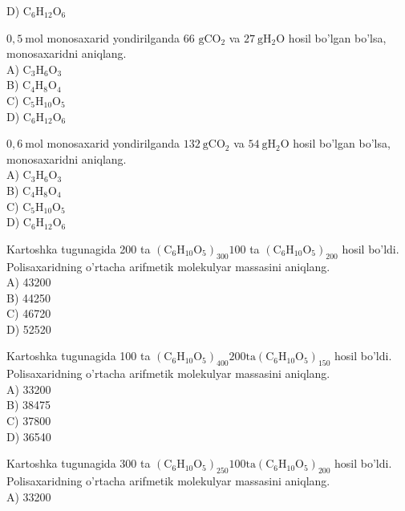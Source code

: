 D) $\mathrm{C}_{6} \mathrm{H}_{12} \mathrm{O}_{6}$
  \item $0,5 \mathrm{~mol}$ monosaxarid yondirilganda 66 $\mathrm{g} \mathrm{CO}_{2}$ va $27 \mathrm{~g} \mathrm{H}_{2} \mathrm{O}$ hosil bo'lgan bo'lsa, monosaxaridni aniqlang.\\
A) $\mathrm{C}_{3} \mathrm{H}_{6} \mathrm{O}_{3}$\\
B) $\mathrm{C}_{4} \mathrm{H}_{8} \mathrm{O}_{4}$\\
C) $\mathrm{C}_{5} \mathrm{H}_{10} \mathrm{O}_{5}$\\
D) $\mathrm{C}_{6} \mathrm{H}_{12} \mathrm{O}_{6}$
  \item $0,6 \mathrm{~mol}$ monosaxarid yondirilganda $132 \mathrm{~g} \mathrm{CO}_{2}$ va $54 \mathrm{~g} \mathrm{H}_{2} \mathrm{O}$ hosil bo'lgan bo'lsa, monosaxaridni aniqlang.\\
A) $\mathrm{C}_{3} \mathrm{H}_{6} \mathrm{O}_{3}$\\
B) $\mathrm{C}_{4} \mathrm{H}_{8} \mathrm{O}_{4}$\\
C) $\mathrm{C}_{5} \mathrm{H}_{10} \mathrm{O}_{5}$\\
D) $\mathrm{C}_{6} \mathrm{H}_{12} \mathrm{O}_{6}$
  \item Kartoshka tugunagida 200 ta $\left(\mathrm{C}_{6} \mathrm{H}_{10} \mathrm{O}_{5}\right)_{300} 100$ ta $\left(\mathrm{C}_{6} \mathrm{H}_{10} \mathrm{O}_{5}\right)_{200}$ hosil bo'ldi. Polisaxaridning o'rtacha arifmetik molekulyar massasini aniqlang.\\
A) 43200\\
B) 44250\\
C) 46720\\
D) 52520
  \item Kartoshka tugunagida 100 ta $\left(\mathrm{C}_{6} \mathrm{H}_{10} \mathrm{O}_{5}\right)_{400} 200 \mathrm{ta}\left(\mathrm{C}_{6} \mathrm{H}_{10} \mathrm{O}_{5}\right)_{150}$ hosil bo'ldi. Polisaxaridning o'rtacha arifmetik molekulyar massasini aniqlang.\\
A) 33200\\
B) 38475\\
C) 37800\\
D) 36540
  \item Kartoshka tugunagida 300 ta $\left(\mathrm{C}_{6} \mathrm{H}_{10} \mathrm{O}_{5}\right)_{250} 100 \mathrm{ta}\left(\mathrm{C}_{6} \mathrm{H}_{10} \mathrm{O}_{5}\right)_{200}$ hosil bo'ldi. Polisaxaridning o'rtacha arifmetik molekulyar massasini aniqlang.\\
A) 33200\\
